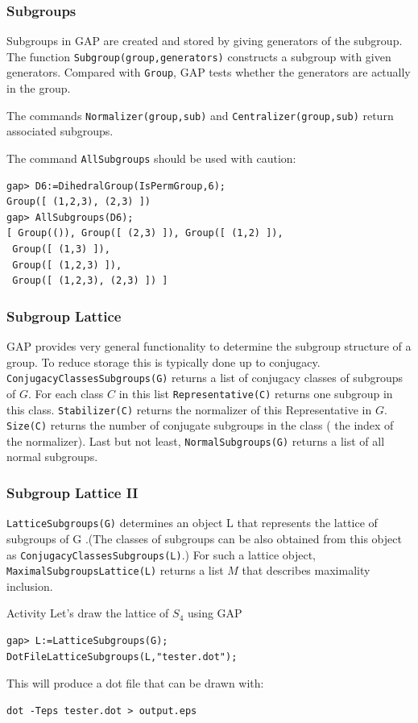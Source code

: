 \documentclass{beamer}
\theoremstyle{definition}
\theoremstyle{remark}
\begin{document}
\begin{frame}[fragile]
	\frametitle{Subgroups}
	Subgroups in GAP are created and stored by giving generators of the subgroup. The function \texttt{Subgroup(group,generators)} constructs a subgroup with given generators. Compared with \texttt{Group}, GAP tests whether the generators are actually in the group.
	
	The commands \texttt{Normalizer(group,sub)} and \texttt{Centralizer(group,sub)} return associated subgroups.
	
	The command \texttt{AllSubgroups} should be used with caution:
\begin{verbatim}
gap> D6:=DihedralGroup(IsPermGroup,6);
Group([ (1,2,3), (2,3) ])
gap> AllSubgroups(D6);
[ Group(()), Group([ (2,3) ]), Group([ (1,2) ]),
 Group([ (1,3) ]), 
 Group([ (1,2,3) ]), 
 Group([ (1,2,3), (2,3) ]) ]
\end{verbatim}
\end{frame}

\begin{frame}[fragile]
	\frametitle{Subgroup Lattice}
	GAP  provides very general functionality to determine the subgroup structure of a group. To reduce storage this is typically done up to
	conjugacy.
	\texttt{ConjugacyClassesSubgroups(G)} returns a list of conjugacy classes of subgroups of $ G $. For each class $ C $ in this list \texttt{Representative(C)} returns one subgroup in this class. \texttt{Stabilizer(C)} returns the normalizer of this Representative in $ G $. \texttt{Size(C)} returns the number of conjugate subgroups
	in the class ( the index of the normalizer). 
	Last but not least, \texttt{NormalSubgroups(G)} returns a list of all normal subgroups.
	
\end{frame}

\begin{frame}[fragile]
	\frametitle{Subgroup Lattice II}
\texttt{LatticeSubgroups(G)} determines an object L that represents the lattice of subgroups of G .(The classes of subgroups can be also obtained from this object as \texttt{ConjugacyClassesSubgroups(L)}.)
For such a lattice object, \texttt{MaximalSubgroupsLattice(L)} returns a list $ M $ that describes maximality
inclusion.
\pause
\begin{alertblock}{Activity}
	Let's draw the lattice of $ S_4 $ using GAP
\end{alertblock}
\begin{verbatim}
gap> L:=LatticeSubgroups(G);
DotFileLatticeSubgroups(L,"tester.dot");
\end{verbatim}
This will produce a dot file that can be drawn with:
\begin{verbatim}
dot -Teps tester.dot > output.eps
\end{verbatim}
\end{frame}
\end{document}
